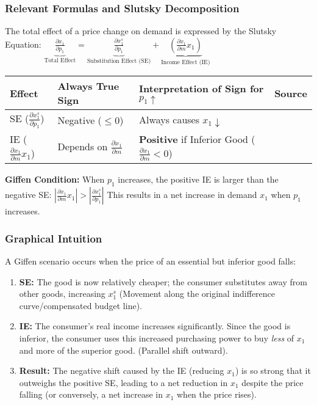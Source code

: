 \documentclass{article}
\begin{document}
\subsubsection*{Relevant Formulas and Slutsky Decomposition}
The total effect of a price change on demand is expressed by the Slutsky Equation: 
$\underbrace{\frac{\partial x_1}{\partial p_1}}_{\text{Total Effect}} = \underbrace{\frac{\partial x_1^s}{\partial p_1}}_{\text{Substitution Effect (SE)}} + \underbrace{\left(\frac{\partial x_1}{\partial m} x_1\right)}_{\text{Income Effect (IE)}}$

\begin{center}
\begin{tabular}{llll}
\toprule
\textbf{Effect} & \textbf{Always True Sign} & \textbf{Interpretation of Sign for $p_1 \uparrow$} & \textbf{Source} \\
\midrule
SE ($\frac{\partial x_1^s}{\partial p_1}$) & Negative ($\leq 0$) & Always causes $x_1 \downarrow$ & \\
IE ($\frac{\partial x_1}{\partial m} x_1$) & Depends on $\frac{\partial x_1}{\partial m}$ & \textbf{Positive} if Inferior Good ($\frac{\partial x_1}{\partial m} < 0$) & \\
\bottomrule

\end{tabular}

\end{center}

\textbf{Giffen Condition:} When $p_1$ increases, the positive IE is larger than the negative SE: 
$\left| \frac{\partial x_1}{\partial m} x_1 \right| > \left| \frac{\partial x_1^s}{\partial p_1} \right|$
This results in a net increase in demand $x_1$ when $p_1$ increases.

\subsubsection*{Graphical Intuition}
A Giffen scenario occurs when the price of an essential but inferior good falls:
\begin{enumerate}
    \item \textbf{SE:} The good is now relatively cheaper; the consumer substitutes away from other goods, increasing $x_1^s$ (Movement along the original indifference curve/compensated budget line).
    \item \textbf{IE:} The consumer's real income increases significantly. Since the good is inferior, the consumer uses this increased purchasing power to buy \textit{less} of $x_1$ and more of the superior good. (Parallel shift outward).
    \item \textbf{Result:} The negative shift caused by the IE (reducing $x_1$) is so strong that it outweighs the positive SE, leading to a net reduction in $x_1$ despite the price falling (or conversely, a net increase in $x_1$ when the price rises).
\end{enumerate}
\end{document}
